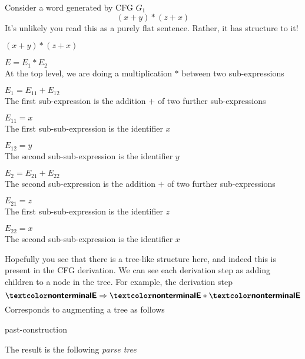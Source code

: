 Consider a word generated by CFG $G_1$
\[(x + y) * (z + x)\]
It's unlikely you read this as a purely flat sentence. Rather, it has structure to it!

$(x + y) * (z + x)$

\begin{tcbleftbar}
$E = E_1 * E_2$\\
At the top level, we are doing a multiplication $*$ between two sub-expressions
\vspace{3mm}
\begin{tcbleftbar}
$E_1 = E_{11} + E_{12}$\\
The first sub-expression is the addition $+$ of two further sub-expressions
\vspace{3mm}
\begin{tcbleftbar}
$E_{11} = x$\\
The first sub-sub-expression is the identifier $x$
\end{tcbleftbar}
\begin{tcbleftbar}
$E_{12} = y$\\
The second sub-sub-expression is the identifier $y$
\end{tcbleftbar}
\end{tcbleftbar}
\begin{tcbleftbar}
$E_2 = E_{21} + E_{22}$\\
The second sub-expression is the addition $+$ of two further sub-expressions
\vspace{3mm}
\begin{tcbleftbar}
$E_{21} = z$\\
The first sub-sub-expression is the identifier $z$
\end{tcbleftbar}
\begin{tcbleftbar}
$E_{22} = x$\\
The second sub-sub-expression is the identifier $x$
\end{tcbleftbar}
\end{tcbleftbar}
\end{tcbleftbar}

Hopefully you see that there is a tree-like structure here, and indeed this is present in the CFG derivation. We can see each derivation step as adding children to a node in the tree. For example, the derivation step
\[\nonterminal{E} \Rightarrow \nonterminal{E} * \nonterminal{E}\]
Corresponds to augmenting a tree as follows
\begin{center}
    {past-construction}
\end{center}
The result is the following \textit{parse tree}

